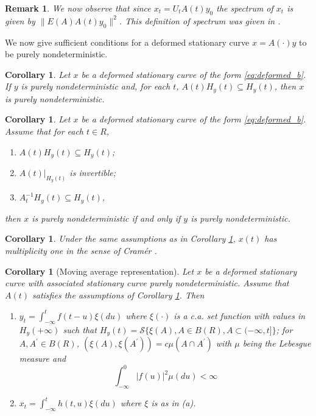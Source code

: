 \documentclass{article}
\newtheorem{corollary}[theorem]{Corollary}
\newtheorem{remark}{Remark}
\begin{document}
\begin{remark}\label{rem:spectrum}
We now observe that since $x_{t}=U_{t} A(t) y_{0}$ the spectrum of $x_{t}$ is given by $\|E(A) A(t) y_{0}\|^{2}$. This definition of spectrum was given in \cite{Priestley}.
\end{remark}

We now give sufficient conditions for a deformed stationary curve $x=A(\cdot) y$ to be purely nondeterministic.

\begin{corollary}\label{cor:nondeterministic}
Let $x$ be a deformed stationary curve of the form \eqref{eq:deformed_b}. If $y$ is purely nondeterministic and, for each $t$, $A(t) H_{y}(t) \subseteq H_{y}(t)$, then $x$ is purely nondeterministic.
\end{corollary}

\begin{corollary}\label{cor:equivalence}
Let $x$ be a deformed stationary curve of the form \eqref{eq:deformed_b}. Assume that for each $t \in R$,
\begin{enumerate}[label=(\roman*)]
    \item $A(t) H_{y}(t) \subseteq H_{y}(t)$;
    \item $A(t)|_{H_{y}(t)}$ is invertible;
    \item $A_{t}^{-1} H_{y}(t) \subseteq H_{y}(t)$,
\end{enumerate}
then $x$ is purely nondeterministic if and only if $y$ is purely nondeterministic.
\end{corollary}

\begin{corollary}\label{cor:multiplicity}
Under the same assumptions as in Corollary \ref{cor:equivalence}, $x(t)$ has multiplicity one in the sense of Cramér \cite{Cramer}.
\end{corollary}

\begin{corollary}[Moving average representation]\label{cor:moving_avg}
Let $x$ be a deformed stationary curve with associated stationary curve purely nondeterministic. Assume that $A(t)$ satisfies the assumptions of Corollary \ref{cor:nondeterministic}. Then
\begin{enumerate}[label=(\alph*)]
    \item $y_{t}=\int_{-\infty}^{t} f(t-u) \xi(du)$ where $\xi(\cdot)$ is a c.a. set function with values in $H_{y}(+\infty)$ such that $H_{y}(t)=\mathcal{S}\{\xi(A), A \in B(R), A \subset(-\infty, t]\}$; for $A, A^{\prime} \in B(R)$, $(\xi(A), \xi(A^{\prime}))=c \mu(A \cap A^{\prime})$ with $\mu$ being the Lebesgue measure and
    \begin{equation}
    \int_{-\infty}^{0}|f(u)|^{2} \mu(du)<\infty \label{eq:f_integral}
    \end{equation}
    \item $x_{t}=\int_{-\infty}^{t} h(t, u) \xi(du)$ where $\xi$ is as in (a).
\end{enumerate}
\end{corollary}
\end{document}
